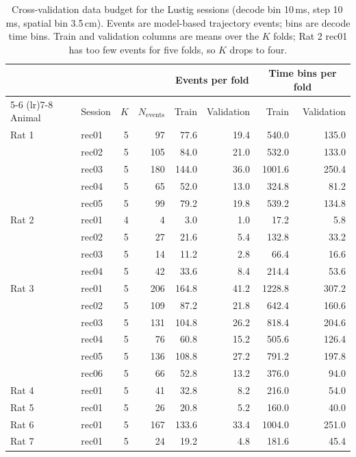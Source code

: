 \begin{table}[htbp]
  \centering
  \begin{tabular}{llrrrrrr}
    \toprule
    & & & & \multicolumn{2}{c}{Events per fold} & \multicolumn{2}{c}{Time bins per fold} \\
    \cmidrule(lr){5-6} \cmidrule(lr){7-8}
    Animal & Session & $K$ & $N_{\mathrm{events}}$ & Train & Validation & Train & Validation \\
    \midrule
    Rat 1 & rec01 & 5 & 97 & 77.6 & 19.4 & 540.0 & 135.0 \\
     & rec02 & 5 & 105 & 84.0 & 21.0 & 532.0 & 133.0 \\
     & rec03 & 5 & 180 & 144.0 & 36.0 & 1001.6 & 250.4 \\
     & rec04 & 5 & 65 & 52.0 & 13.0 & 324.8 & 81.2 \\
     & rec05 & 5 & 99 & 79.2 & 19.8 & 539.2 & 134.8 \\
    \addlinespace
    Rat 2 & rec01 & 4 & 4 & 3.0 & 1.0 & 17.2 & 5.8 \\
     & rec02 & 5 & 27 & 21.6 & 5.4 & 132.8 & 33.2 \\
     & rec03 & 5 & 14 & 11.2 & 2.8 & 66.4 & 16.6 \\
     & rec04 & 5 & 42 & 33.6 & 8.4 & 214.4 & 53.6 \\
    \addlinespace
    Rat 3 & rec01 & 5 & 206 & 164.8 & 41.2 & 1228.8 & 307.2 \\
     & rec02 & 5 & 109 & 87.2 & 21.8 & 642.4 & 160.6 \\
     & rec03 & 5 & 131 & 104.8 & 26.2 & 818.4 & 204.6 \\
     & rec04 & 5 & 76 & 60.8 & 15.2 & 505.6 & 126.4 \\
     & rec05 & 5 & 136 & 108.8 & 27.2 & 791.2 & 197.8 \\
     & rec06 & 5 & 66 & 52.8 & 13.2 & 376.0 & 94.0 \\
    \addlinespace
    Rat 4 & rec01 & 5 & 41 & 32.8 & 8.2 & 216.0 & 54.0 \\
    \addlinespace
    Rat 5 & rec01 & 5 & 26 & 20.8 & 5.2 & 160.0 & 40.0 \\
    \addlinespace
    Rat 6 & rec01 & 5 & 167 & 133.6 & 33.4 & 1004.0 & 251.0 \\
    \addlinespace
    Rat 7 & rec01 & 5 & 24 & 19.2 & 4.8 & 181.6 & 45.4 \\
    \bottomrule
  \end{tabular}
  \caption{Cross-validation data budget for the Lustig sessions (decode bin 10\,ms, step 10\,ms, spatial bin 3.5\,cm). Events are model-based trajectory events; bins are decode time bins. Train and validation columns are means over the $K$ folds; Rat 2 rec01 has too few events for five folds, so $K$ drops to four.}
  \label{tab:cv-budget-lustig}
\end{table}
